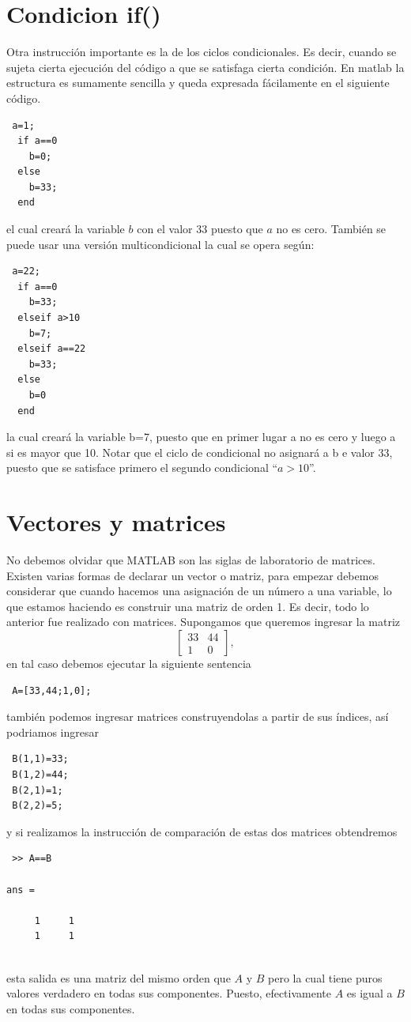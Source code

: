 \documentclass[11pt,legalpaper]{article}
\begin{document}
\section{Condicion if()}
Otra instrucci\'on importante es la de los ciclos condicionales. Es decir, cuando se sujeta cierta 
ejecuci\'on del c\'odigo a que se satisfaga cierta condici\'on. En matlab la estructura es sumamente sencilla 
y queda expresada f\'acilamente en el siguiente c\'odigo.
\begin{lstlisting}
 a=1;
  if a==0
    b=0;
  else
    b=33;
  end
\end{lstlisting}
el cual crear\'a la variable $b$ con el valor $33$ puesto que $a$ no es cero. Tambi\'en se puede usar una versi\'on multicondicional 
la cual se opera seg\'un:
\begin{lstlisting}
 a=22;
  if a==0
    b=33;
  elseif a>10
    b=7;
  elseif a==22
    b=33;
  else
    b=0
  end
\end{lstlisting}
la cual crear\'a la variable b=7, puesto que en primer lugar a no es cero y luego a si es mayor que 10. Notar que el ciclo 
de condicional no asignar\'a a b e valor 33, puesto que se satisface primero el segundo condicional ``$a>10$''.
%
\section{Vectores y matrices}
No debemos olvidar que MATLAB son las siglas de laboratorio de matrices. Existen varias formas de declarar un vector o matriz, 
para empezar debemos considerar que cuando hacemos una asignaci\'on de un n\'umero a una variable, lo que estamos haciendo es 
construir una matriz de orden 1. Es decir, todo lo anterior fue realizado con matrices. Supongamos que queremos 
ingresar la matriz
$$
\left [
  \begin{array}{cc}
    33 & 44 \\
    1  & 0
  \end{array}
\right ],
$$
en tal caso debemos ejecutar la siguiente sentencia
\begin{verbatim}
 A=[33,44;1,0];
\end{verbatim}
tambi\'en podemos ingresar matrices construyendolas a partir de sus \'indices, as\'i podriamos ingresar 
\begin{lstlisting}
 B(1,1)=33;
 B(1,2)=44;
 B(2,1)=1;
 B(2,2)=5;
\end{lstlisting}
y si realizamos la instrucci\'on de comparaci\'on de estas dos matrices obtendremos
\begin{verbatim}
 >> A==B

ans =

     1     1
     1     1
     
\end{verbatim}
esta salida es una matriz del mismo orden que $A$ y $B$ pero la cual tiene puros valores verdadero 
en todas sus componentes. Puesto, efectivamente $A$ es igual a $B$ en todas sus componentes.
\end{document}
